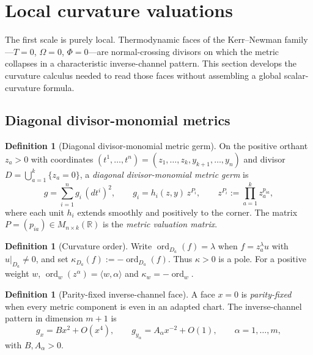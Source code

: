 \documentclass[11pt,a4paper]{article}
\theoremstyle{definition}
\newtheorem{definition}[theorem]{Definition}
\theoremstyle{remark}
\newcommand{\RR}{\mathbb{R}}
\newcommand{\ord}{\operatorname{ord}}
\begin{document}
\section{Local curvature valuations}
\label{sec:local}

The first scale is purely local. Thermodynamic faces of the Kerr--Newman
family---\(T=0\), \(\Omega=0\), \(\Phi=0\)---are normal-crossing divisors on
which the metric collapses in a characteristic inverse-channel pattern. This
section develops the curvature calculus needed to read those faces without
assembling a global scalar-curvature formula.

\subsection{Diagonal divisor-monomial metrics}

\begin{definition}[Diagonal divisor-monomial metric germ]
\label{def:divgerm}
On the positive orthant \(z_a>0\) with coordinates
\((t^1,\ldots,t^n)=(z_1,\ldots,z_k,y_{k+1},\ldots,y_n)\) and divisor
\(D=\bigcup_{a=1}^k\{z_a=0\}\), a \emph{diagonal divisor-monomial metric germ}
is
\[
g=\sum_{i=1}^{n}g_i\,(dt^i)^2,
\qquad
g_i=h_i(z,y)\,z^{P_i},
\qquad
z^{P_i}:=\prod_{a=1}^{k}z_a^{p_{ia}},
\]
where each unit \(h_i\) extends smoothly and positively to the corner. The
matrix \(P=(p_{ia})\in M_{n\times k}(\RR)\) is the \emph{metric valuation
matrix}.
\end{definition}

\begin{definition}[Curvature order]
\label{def:curvord}
Write \(\ord_{D_a}(f)=\lambda\) when \(f=z_a^\lambda u\) with \(u|_{D_a}\neq0\),
and set \(\kappa_{D_a}(f):=-\ord_{D_a}(f)\). Thus \(\kappa>0\) is a pole. For a
positive weight \(w\), \(\ord_w(z^\alpha)=\langle w,\alpha\rangle\) and
\(\kappa_w=-\ord_w\).
\end{definition}

\begin{definition}[Parity-fixed inverse-channel face]
\label{def:parityface}
A face \(x=0\) is \emph{parity-fixed} when every metric component is even in an
adapted chart. The inverse-channel pattern in dimension \(m+1\) is
\[
g_x=Bx^2+O(x^4),
\qquad
g_{y_\alpha}=A_\alpha x^{-2}+O(1),
\qquad \alpha=1,\ldots,m,
\]
with \(B,A_\alpha>0\).
\end{definition}
\end{document}
